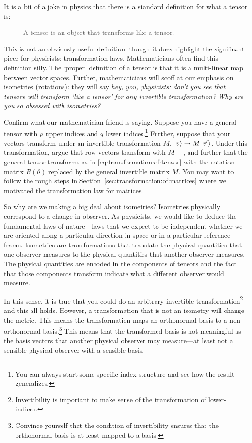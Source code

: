 \documentclass[12pt]{article}
\begin{document}
It is a bit of a joke in physics that there is a standard definition for what a tensor is:
\begin{quote}
A tensor is an object that transforms like a tensor.
\end{quote}
This is not an obviously useful definition, though it does highlight the significant piece for physicists: transformation laws. Mathematicians often find this definition silly. The `proper' definition of a tensor is that it is a multi-linear map between vector spaces. Further, mathematicians will scoff at our emphasis on isometries (rotations): they will say \emph{hey, you, physicists: don't you see that tensors will transform `like a tensor' for any invertible transformation? Why are you so obsessed with isometries?}

\begin{exercise}
Confirm what our mathematician friend is saying. Suppose you have a general tensor with $p$ upper indices and $q$ lower indices.\footnote{You can always start some specific index structure and see how the result generalizes.} Further, suppose that your vectors transform under an invertible transformation $M$, $\left|v\right\rangle\to M\left|v'\right\rangle$. Under this transformation, argue that row vectors transform with $M^{-1}$, and further that the general tensor transforms as in \eqref{eq:transformation:of:tensor} with the rotation matrix $R(\theta)$ replaced by the general invertible matrix $M$. You may want to follow the rough steps in Section~\ref{sec:transformation:of:matrices} where we motivated the transformation law for matrices.
\end{exercise}

So why are we making a big deal about isometries? Isometries physically correspond to a change in observer. As physicists, we would like to deduce the fundamental laws of nature---laws that we expect to be independent whether we are oriented along a particular direction in space or in a particular reference frame. Isometries are transformations that translate the physical quantities that one observer measures to the physical quantities that another observer measures. The physical quantities are encoded in the components of tensors and the fact that those components transform indicate what a different observer would measure.

In this sense, it is true that you could do an arbitrary invertible transformation\footnote{Invertibility is important to make sense of the transformation of lower-indices.} and this all holds. However, a transformation that is not an isometry will change the metric. This means the transformation maps an orthonormal basis to a non-orthonormal basis.\footnote{Convince yourself that the condition of invertibility ensures that the orthonormal basis is at least mapped to a basis.} This means that the transformed basis is not meaningful as the basis vectors that another physical observer may measure---at least not a sensible physical observer with a sensible basis.
\end{document}
